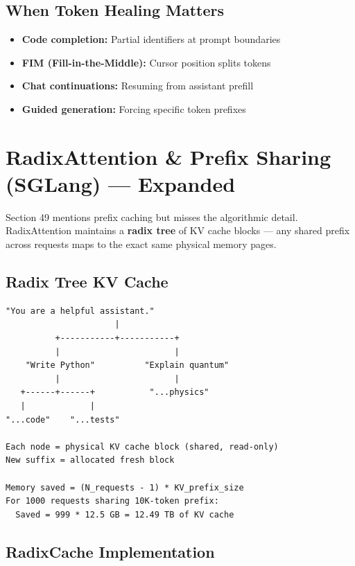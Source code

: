\documentclass[11pt,a4paper]{article}
\begin{document}
\subsection{When Token Healing Matters}

\begin{itemize}[itemsep=1pt]
  \item \textbf{Code completion:} Partial identifiers at prompt boundaries
  \item \textbf{FIM (Fill-in-the-Middle):} Cursor position splits tokens
  \item \textbf{Chat continuations:} Resuming from assistant prefill
  \item \textbf{Guided generation:} Forcing specific token prefixes
\end{itemize}

\section{RadixAttention \& Prefix Sharing (SGLang) --- Expanded}

Section 49 mentions prefix caching but misses the algorithmic detail. RadixAttention maintains a \textbf{radix tree} of KV cache blocks --- any shared prefix across requests maps to the exact same physical memory pages.

\subsection{Radix Tree KV Cache}

\begin{lstlisting}[basicstyle=\ttfamily\small, caption={Radix Tree KV Cache Example}]
         "You are a helpful assistant."
                      |
          +-----------+-----------+
          |                       |
    "Write Python"          "Explain quantum"
          |                       |
   +------+------+           "...physics"
   |             |
"...code"    "...tests"

Each node = physical KV cache block (shared, read-only)
New suffix = allocated fresh block

Memory saved = (N_requests - 1) * KV_prefix_size
For 1000 requests sharing 10K-token prefix:
  Saved = 999 * 12.5 GB = 12.49 TB of KV cache
\end{lstlisting}

\subsection{RadixCache Implementation}
\end{document}
